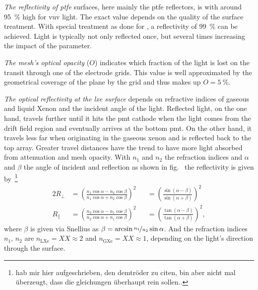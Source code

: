 \emph{The reflectivity of \gls{ptfe}} surfaces, here mainly the \gls{ptfe} reflectors, is with around \SI{95}{\%} high for \gls{vuv} light.
The exact value depends on the quality of the surface treatment.
With special treatment as done for \oneton, a reflectivity of \SI{99}{\%} can be achieved\cite{?}. %
Light is typically not only reflected once, but several times increasing the impact of the parameter.


\emph{The mesh's optical opacity} ($ O $) indicates which fraction of the light is lost on the transit through one of the electrode grids.
This value is well approximated by the geometrical coverage of the plane by the grid and thus makes up $ O = \SI{5}{\%} $.


\emph{The optical reflectivity at the \gls{lxe} surface} depends on refractive indices of gaseous and liquid Xenon and the incident angle of the light.
Reflected light, on the one hand, travels further until it hits the \gls{pmt} cathode when the light comes from the drift field region and eventually arrives at the bottom \gls{pmt}.
On the other hand, it travels less far when originating in the gaseous xenon and is reflected back to the top array.
Greater travel distances have the trend to have more light absorbed from attenuation and mesh opacity.
With $ n_1 $ and $ n_2 $ the refraction indices and $ \alpha $ and $ \beta $ the angle of incident and reflection as shown in fig.~%
the reflectivity is given by~\cite{?}\footnote{hab mir hier aufgeschrieben, den demtröder zu citen, bin aber nicht mal überzeugt, dass die gleichungen überhaupt rein sollen..}  %
\begin{alignat}{2}
    \label{eq:reflectivityA}
    R_\perp &= \left( \frac{ n_1 \cos{\alpha} - n_2 \cos{\beta} }{ n_1 \cos{\alpha} + n_2 \cos{\beta} } \right)^2 &
            &=  \left( \frac{ \sin{\left( \alpha-\beta \right)}}{ \sin{\left( \alpha+\beta \right)} } \right)^2 \\
    R_\parallel &= \left( \frac{ n_2 \cos{\alpha} - n_1 \cos{\beta} }{ n_2 \cos{\alpha} + n_1 \cos{\beta} } \right)^2 &
                &=  \left( \frac{ \tan{\left( \alpha-\beta \right)}}{ \tan{\left( \alpha+\beta \right)} } \right)^2,
    \label{eq:reflectivityB}
\end{alignat}
where $ \beta $ is given via Snellius as $ \beta = \arcsin{\nicefrac{n_1}{n_2} \sin{\alpha} } $.
And the refraction indices $ n_1 $, $ n_2 $ are $ n_\mathrm{LXe} = XX \approx 2 $ and $ n_\mathrm{GXe} = XX \approx 1 $, depending on the light's direction through the surface.

